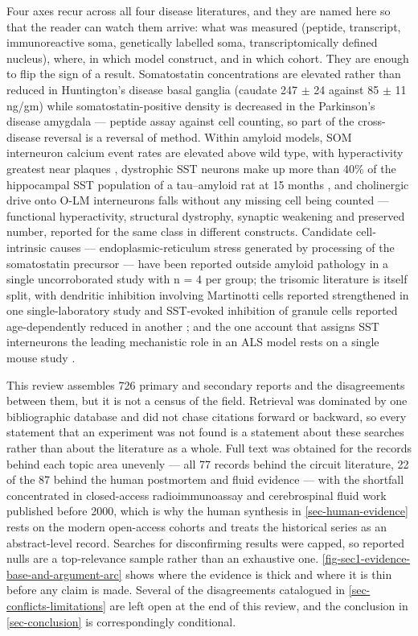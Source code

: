 \documentclass[11pt]{article}
\begin{document}
Four axes recur across all four disease literatures, and they are named here so that the reader can watch them arrive: what was measured (peptide, transcript, immunoreactive soma, genetically labelled soma, transcriptomically defined nucleus), where, in which model construct, and in which cohort. They are enough to flip the sign of a result. Somatostatin concentrations are elevated rather than reduced in Huntington's disease basal ganglia (caudate 247 $\pm$ 24 against 85 $\pm$ 11 ng/gm) \citep{Aronin1983} while somatostatin-positive density is decreased in the Parkinson's disease amygdala \citep{FloresCuadrado2017} --- peptide assay against cell counting, so part of the cross-disease reversal is a reversal of method. Within amyloid models, SOM interneuron calcium event rates are elevated above wild type, with hyperactivity greatest near plaques \citep{Algamal2022b}, dystrophic SST neurons make up more than 40\% of the hippocampal SST population of a tau--amyloid rat at 15 months \citep{Morrone2022}, and cholinergic drive onto O-LM interneurons falls without any missing cell being counted \citep{Schmid2016} --- functional hyperactivity, structural dystrophy, synaptic weakening and preserved number, reported for the same class in different constructs. Candidate cell-intrinsic causes --- endoplasmic-reticulum stress generated by processing of the somatostatin precursor \citep{Tomoda2022} --- have been reported outside amyloid pathology in a single uncorroborated study with n = 4 per group; the trisomic literature is itself split, with dendritic inhibition involving Martinotti cells reported strengthened in one single-laboratory study and SST-evoked inhibition of granule cells reported age-dependently reduced in another \citep{ZorrillaDeSanMartin2020,Gutmann2026}; and the one account that assigns SST interneurons the leading mechanistic role in an ALS model rests on a single mouse study \citep{Zhang2016}.

This review assembles 726 primary and secondary reports and the disagreements between them, but it is not a census of the field. Retrieval was dominated by one bibliographic database and did not chase citations forward or backward, so every statement that an experiment was not found is a statement about these searches rather than about the literature as a whole. Full text was obtained for the records behind each topic area unevenly --- all 77 records behind the circuit literature, 22 of the 87 behind the human postmortem and fluid evidence --- with the shortfall concentrated in closed-access radioimmunoassay and cerebrospinal fluid work published before 2000, which is why the human synthesis in \ref{sec-human-evidence} rests on the modern open-access cohorts and treats the historical series as an abstract-level record. Searches for disconfirming results were capped, so reported nulls are a top-relevance sample rather than an exhaustive one. \ref{fig-sec1-evidence-base-and-argument-arc} shows where the evidence is thick and where it is thin before any claim is made. Several of the disagreements catalogued in \ref{sec-conflicts-limitations} are left open at the end of this review, and the conclusion in \ref{sec-conclusion} is correspondingly conditional.
\end{document}
